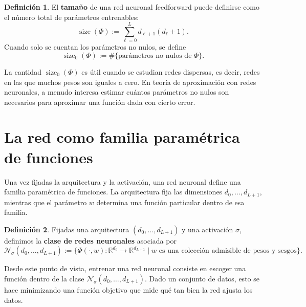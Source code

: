 \documentclass[11pt]{report}
\newenvironment{tcolorbox}[1][]{\par\medskip\noindent\ignorespaces}{\par\medskip}
\theoremstyle{definition}
\newtheorem{definicion}{Definición}[section]
\theoremstyle{plain}
\numberwithin{equation}{section}
\begin{document}
\begin{tcolorbox}[colback=blue!8, colframe=blue!8, boxrule=0pt]
\begin{definicion}
El \textbf{tamaño} de una red neuronal feedforward puede definirse como el número total de parámetros entrenables:
\begin{equation*}
    \operatorname{size}(\Phi)
    :=
    \sum_{\ell=0}^{L}
    d_{\ell+1}(d_\ell+1).
\end{equation*}
Cuando solo se cuentan los parámetros no nulos, se define
\begin{equation*}
    \operatorname{size}_0(\Phi)
    :=
    \#\{ \text{parámetros no nulos de } \Phi\}.
\end{equation*}
\end{definicion}
\end{tcolorbox}

La cantidad \(\operatorname{size}_0(\Phi)\) es útil cuando se estudian redes dispersas, es decir, redes en las que muchos pesos son iguales a cero. En teoría de aproximación con redes neuronales, a menudo interesa estimar cuántos parámetros no nulos son necesarios para aproximar una función dada con cierto error.

\section{La red como familia paramétrica de funciones}

Una vez fijadas la arquitectura y la activación, una red neuronal define una familia paramétrica de funciones. La arquitectura fija las dimensiones \(d_0,\ldots,d_{L+1}\), mientras que el parámetro \(w\) determina una función particular dentro de esa familia.

\begin{tcolorbox}[colback=blue!8, colframe=blue!8, boxrule=0pt]
\begin{definicion}
Fijadas una arquitectura \((d_0,\ldots,d_{L+1})\) y una activación \(\sigma\), definimos la \textbf{clase de redes neuronales} asociada por
\begin{equation*}
    \mathcal{N}_{\sigma}(d_0,\ldots,d_{L+1})
    :=
    \{
        \Phi(\cdot,w):\mathbb{R}^{d_0}\to\mathbb{R}^{d_{L+1}}
        \mid
        w \text{ es una colección admisible de pesos y sesgos}
    \}.
\end{equation*}
\end{definicion}
\end{tcolorbox}

Desde este punto de vista, entrenar una red neuronal consiste en escoger una función dentro de la clase \(\mathcal{N}_{\sigma}(d_0,\ldots,d_{L+1})\). Dado un conjunto de datos, esto se hace minimizando una función objetivo que mide qué tan bien la red ajusta los datos.
\end{document}
